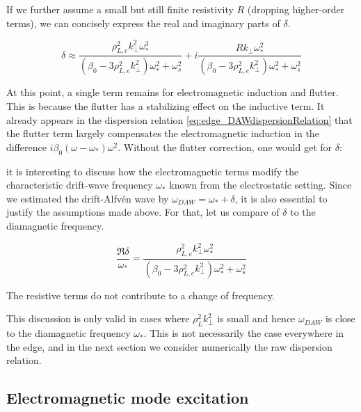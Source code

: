 If we further assume a small but still finite resistivity $R$ (dropping higher-order terms), we can concisely express the real and imaginary parts of $\delta$.

\begin{equation}
	\delta \approx \frac{\rho_{L,e}^2k_\perp^{2} \omega_*^{3} }{\left(\beta_{0}  - 3 \rho_{L,e}^2 k_\perp^{2}\right)\omega_*^{2} + \omega_s^{2}} + i\frac{Rk_\perp\omega_*^{2}}{\left(\beta_{0}  - 3 \rho_{L,e}^2 k_\perp^{2}\right)\omega_*^{2} + \omega_s^{2} }	
\end{equation}

At this point, a single term remains for electromagnetic induction and flutter. This is because the flutter has a stabilizing effect on the inductive term. It already appears in the dispersion relation \ref{eq:edge_DAWdispersionRelation} that the flutter term largely compensates the electromagnetic induction in the difference $i\beta_0\left(\omega - \omega_*\right)\omega^2$. Without the flutter correction, one would get for $\delta$:




it is interesting to discuss how the electromagnetic terms modify the characteristic drift-wave frequency $\omega_*$ known from the electrostatic setting. Since we estimated the drift-Alfvén wave by $\omega_{DAW} = \omega_* + \delta$, it is also essential to justify the assumptions made above. For that, let us compare of $\delta$ to the diamagnetic frequency. 

\begin{equation}
	\frac{\Re{\delta}}{\omega_*} = \frac{\rho_{L,e}^2k_\perp^{2} \omega_*^{2} }{\left(\beta_{0}  - 3 \rho_{L,e}^2 k_\perp^{2}\right)\omega_*^{2} + \omega_s^{2} }
\end{equation}

The resistive terms do not contribute to a change of frequency. 

This discussion is only valid in cases where $\rho_L^2k_\perp^2$ is small and hence $\omega_{DAW}$ is close to the diamagnetic frequency $\omega_*$. This is not necessarily the case everywhere in the edge, and in the next section we consider numerically the raw dispersion relation.



\subsection{Electromagnetic mode excitation}
\label{ssec:edge_DAW_modeExcitation}

